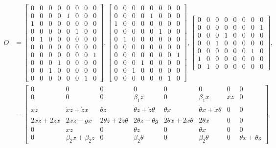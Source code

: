 \documentclass[12pt]{article}
\begin{document}
\begin{align*}
    O &= 
    \left[\begin{matrix}0 & 0 & 0 & 0 & 0 & 0 & 0 & 0\\0 & 0 & 0 & 0 & 1 & 0 & 0 & 0\\1 & 0 & 0 & 0 & 0 & 0 & 0 & 0\\0 & 0 & 0 & 0 & 0 & 1 & 0 & 0\\0 & 1 & 0 & 0 & 0 & 0 & 0 & 0\\0 & 0 & 0 & 0 & 0 & 0 & 0 & 0\\0 & 0 & 0 & 0 & 0 & 0 & 0 & 1\\0 & 0 & 0 & 1 & 0 & 0 & 0 & 0\\0 & 0 & 1 & 0 & 0 & 0 & 0 & 0\\0 & 0 & 0 & 0 & 0 & 0 & 1 & 0\end{matrix}\right], 
    \left[\begin{matrix}0 & 0 & 0 & 0 & 0 & 0 & 0 & 0\\0 & 0 & 0 & 0 & 1 & 0 & 0 & 0\\1 & 0 & 0 & 0 & 0 & 0 & 0 & 0\\0 & 0 & 0 & 0 & 0 & 1 & 0 & 0\\0 & 1 & 0 & 0 & 0 & 0 & 0 & 0\\0 & 0 & 0 & 0 & 0 & 0 & 0 & 0\\0 & 0 & 0 & 0 & 0 & 0 & 0 & 1\\0 & 0 & 0 & 1 & 0 & 0 & 0 & 0\\0 & 0 & 1 & 0 & 0 & 0 & 0 & 0\\0 & 0 & 0 & 0 & 0 & 0 & 1 & 0\end{matrix}\right], 
    \left[\begin{matrix}0 & 0 & 0 & 0 & 0 & 0 & 0 & 0\\0 & 0 & 0 & 0 & 0 & 0 & 0 & 1\\0 & 0 & 0 & 1 & 0 & 0 & 0 & 0\\0 & 0 & 1 & 0 & 0 & 0 & 0 & 0\\0 & 0 & 0 & 0 & 0 & 0 & 1 & 0\\1 & 0 & 0 & 0 & 0 & 0 & 0 & 0\\0 & 1 & 0 & 0 & 0 & 0 & 0 & 0\end{matrix}\right], \\
    &=
    \left[\begin{matrix}0 & 0 & 0 & 0 & 0 & 0 & 0 & 0\\0 & 0 & 0 & \beta_{1} z & 0 & \beta_{1} x & x z & 0\\x z & \dot{x} z + \dot{z} x & \theta z & \dot{\theta} z + \dot{z} \theta & \theta x & \dot{\theta} x + \dot{x} \theta & 0 & 0\\2 \dot{x} z + 2 \dot{z} x & 2 \dot{x} \dot{z} - g x & 2 \dot{\theta} z + 2 \dot{z} \theta & 2 \dot{\theta} \dot{z} - \theta g & 2 \dot{\theta} x + 2 \dot{x} \theta & 2 \dot{\theta} \dot{x} & 0 & 0\\0 & x z & 0 & \theta z & 0 & \theta x & 0 & 0\\0 & \beta_{2} x + \beta_{2} z & 0 & \beta_{2} \theta & 0 & \beta_{2} \theta & 0 & \theta x + \theta z\end{matrix}\right], \\

\end{align*}
\end{document}
